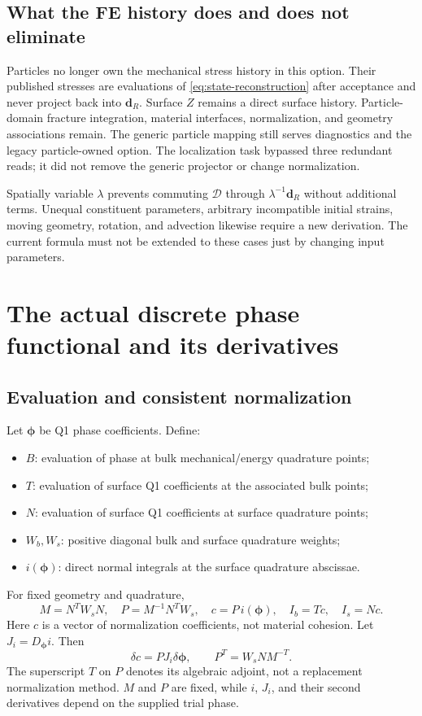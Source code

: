 \documentclass[11pt,a4paper]{article}
\newcommand{\vect}[1]{\boldsymbol{#1}}
\begin{document}
\subsection{What the FE history does and does not eliminate}

Particles no longer own the mechanical stress history in this option. Their
published stresses are evaluations of \cref{eq:state-reconstruction} after
acceptance and never project back into $\bm d_R$. Surface $Z$ remains a direct
surface history. Particle-domain fracture integration, material interfaces,
normalization, and geometry associations remain. The generic particle
mapping still serves diagnostics and the legacy particle-owned option.
The localization task bypassed three redundant reads; it did not remove the
generic projector or change normalization.

Spatially variable $\lambda$ prevents commuting $\mathcal D$ through
$\lambda^{-1}\bm d_R$ without additional terms. Unequal constituent parameters,
arbitrary incompatible initial strains, moving geometry, rotation, and
advection likewise require a new derivation. The current formula must not be
extended to these cases just by changing input parameters.

\section{The actual discrete phase functional and its derivatives}
\label{sec:discrete-phase}

\subsection{Evaluation and consistent normalization}

Let $\vect\phi$ be Q1 phase coefficients. Define:
\begin{itemize}
 \item $B$: evaluation of phase at bulk mechanical/energy quadrature points;
 \item $T$: evaluation of surface Q1 coefficients at the associated bulk points;
 \item $N$: evaluation of surface Q1 coefficients at surface quadrature points;
 \item $W_b,W_s$: positive diagonal bulk and surface quadrature weights;
 \item $i(\vect\phi)$: direct normal integrals at the surface quadrature abscissae.
\end{itemize}
For fixed geometry and quadrature,
\begin{equation}
 M=N^TW_sN,\quad P=M^{-1}N^TW_s,\quad
 c=P\,i(\vect\phi),\quad I_b=Tc,\quad I_s=Nc.
 \label{eq:projection}
\end{equation}
Here $c$ is a vector of normalization coefficients, not material cohesion.
Let $J_i=D_{\vect\phi}i$. Then
\begin{equation}
 \delta c=P J_i\delta\vect\phi,\qquad
 P^T=W_sNM^{-T}.
 \label{eq:projection-adjoint}
\end{equation}
The superscript $T$ on $P$ denotes its algebraic adjoint, not a replacement
normalization method. $M$ and $P$ are fixed, while $i$, $J_i$, and their second
derivatives depend on the supplied trial phase.
\end{document}
